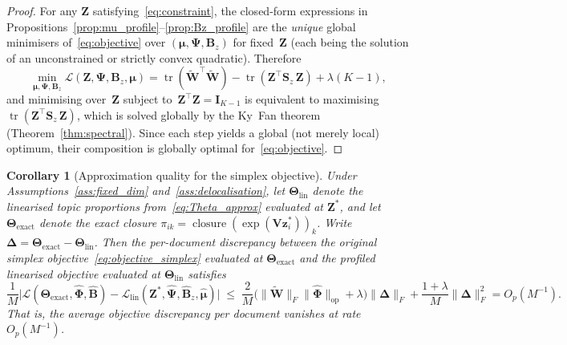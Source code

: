 \documentclass{article}
\newtheorem{corollary}[theorem]{Corollary}
\DeclareMathOperator{\tr}{tr}
\DeclareMathOperator{\closure}{closure}
\begin{document}
\begin{proof}
For any $\mathbf{Z}$ satisfying~\eqref{eq:constraint}, the
closed-form expressions in
Propositions~\ref{prop:mu_profile}--\ref{prop:Bz_profile} are the
\emph{unique} global minimisers of~\eqref{eq:objective} over
$(\boldsymbol{\mu},\boldsymbol{\Psi},\mathbf{B}_z)$ for
fixed~$\mathbf{Z}$ (each being the solution of an unconstrained or
strictly convex quadratic). Therefore
\[
  \min_{\boldsymbol{\mu},\boldsymbol{\Psi},\mathbf{B}_z}
  \mathcal{L}(\mathbf{Z},\boldsymbol{\Psi},\mathbf{B}_z,\boldsymbol{\mu})
  = \tr(\widetilde{\mathbf{W}}^{\!\top}\widetilde{\mathbf{W}})
    - \tr(\mathbf{Z}^{\!\top}\mathbf{S}_z\,\mathbf{Z})
    + \lambda(K{-}1),
\]
and minimising over~$\mathbf{Z}$ subject
to~$\mathbf{Z}^{\!\top}\mathbf{Z}=\mathbf{I}_{K-1}$ is equivalent to
maximising $\tr(\mathbf{Z}^{\!\top}\mathbf{S}_z\,\mathbf{Z})$, which
is solved globally by the Ky~Fan theorem
(Theorem~\ref{thm:spectral}). Since each step yields a global
(not merely local) optimum, their composition is globally optimal
for~\eqref{eq:objective}.
\end{proof}

\begin{corollary}[Approximation quality for the simplex objective]
\label{cor:approx_quality}
Under Assumptions~\ref{ass:fixed_dim} and~\ref{ass:delocalisation},
let $\boldsymbol{\Theta}_{\mathrm{lin}}$ denote the linearised
topic proportions from~\eqref{eq:Theta_approx} evaluated at
$\mathbf{Z}^*$, and let
$\boldsymbol{\Theta}_{\mathrm{exact}}$ denote the exact closure
$\pi_{ik}=\closure(\exp(\mathbf{V}\mathbf{z}_i^*))_k$.
Write $\boldsymbol{\Delta}
= \boldsymbol{\Theta}_{\mathrm{exact}}-\boldsymbol{\Theta}_{\mathrm{lin}}$.
Then the \emph{per-document} discrepancy between the original simplex
objective~\eqref{eq:objective_simplex} evaluated at
$\boldsymbol{\Theta}_{\mathrm{exact}}$ and the profiled linearised
objective evaluated at $\boldsymbol{\Theta}_{\mathrm{lin}}$ satisfies
\begin{equation}
  \frac{1}{M}
  \bigl|
    \mathcal{L}(\boldsymbol{\Theta}_{\mathrm{exact}},
      \hat{\boldsymbol{\Phi}},\hat{\mathbf{B}})
    - \mathcal{L}_{\mathrm{lin}}(\mathbf{Z}^*,
      \hat{\boldsymbol{\Psi}},\hat{\mathbf{B}}_z,\hat{\boldsymbol{\mu}})
  \bigr|
  \;\leq\;
  \frac{2}{M}\bigl(\|\widetilde{\mathbf{W}}\|_F
         \|\hat{\boldsymbol{\Phi}}\|_{\mathrm{op}}
         + \lambda\bigr)
  \|\boldsymbol{\Delta}\|_F
  + \frac{1+\lambda}{M}\|\boldsymbol{\Delta}\|_F^2
  = O_p(M^{-1}).
  \label{eq:approx_quality}
\end{equation}
That is, the average objective discrepancy per document vanishes at
rate $O_p(M^{-1})$.
\end{corollary}
\end{document}
